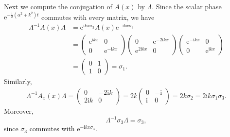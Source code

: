 \documentclass{amsart}
\numberwithin{equation}{hw}
\begin{document}
Next we compute the conjugation of $A(x)$ by $\Lambda$. Since the scalar phase
\(
{\mathrm e}^{-\frac{\mathrm{i}}{2}(\alpha^2+k^2)t}
\)
commutes with every matrix, we have
\begin{align}
\Lambda^{-1}A(x)\Lambda
&=
{\mathrm e}^{\mathrm{i}kx\sigma_3}
A(x)
{\mathrm e}^{-\mathrm{i}kx\sigma_3}
\nonumber\\
&=
\begin{pmatrix}
{\mathrm e}^{\mathrm{i}kx} & 0
\\
0 & {\mathrm e}^{-\mathrm{i}kx}
\end{pmatrix}
\begin{pmatrix}
0 & {\mathrm e}^{-2\mathrm{i}kx}
\\
{\mathrm e}^{2\mathrm{i}kx} & 0
\end{pmatrix}
\begin{pmatrix}
{\mathrm e}^{-\mathrm{i}kx} & 0
\\
0 & {\mathrm e}^{\mathrm{i}kx}
\end{pmatrix}
\nonumber\\
&=
\begin{pmatrix}
0 & 1
\\
1 & 0
\end{pmatrix}
=
\sigma_1.
\label{eq:A-conjugation}
\end{align}
Similarly,
\begin{align}
\Lambda^{-1}A_x(x)\Lambda
=
\begin{pmatrix}
0 & -2\mathrm{i}k
\\
2\mathrm{i}k & 0
\end{pmatrix}
=
2k
\begin{pmatrix}
0 & -\mathrm{i}
\\
\mathrm{i} & 0
\end{pmatrix}
=
2k\sigma_2
=
2\mathrm{i}k\sigma_1\sigma_3.
\label{eq:Ax-conjugation}
\end{align}
Moreover,
\begin{equation}
\Lambda^{-1}\sigma_3\Lambda
=
\sigma_3,
\label{eq:sigma3-conjugation}
\end{equation}
since $\sigma_3$ commutes with ${\mathrm e}^{-\mathrm{i}kx\sigma_3}$.
\end{document}
